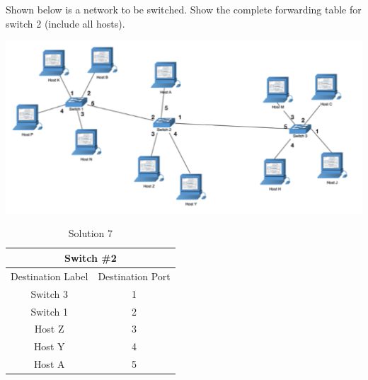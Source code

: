 \documentclass[12pt,addpoints,answers]{exam}
\begin{document}
\begin{questions}
\question[10] Shown below is a network to be switched. Show the complete forwarding table for switch 2 (include all hosts).
\begin{center}\includegraphics[width=0.9\linewidth]{fig/switches.png}\end{center}
\begin{solution}[5in]
	\begin{table}[H]
		\centering
		\caption{Solution 7}
		\label{Table 1}
		\begin{tabular}{|c|c|}
			\hline
			\multicolumn{2}{|c|}{Switch \#2}      \\ \hline
			Destination Label & Destination Port \\ \hline
			Switch 3          & 1                \\
			Switch 1          & 2                \\
			Host Z            & 3                \\
			Host Y            & 4                \\
			Host A            & 5                \\ \hline
		\end{tabular}
	\end{table}
\end{solution}



\end{questions}
\end{document}
